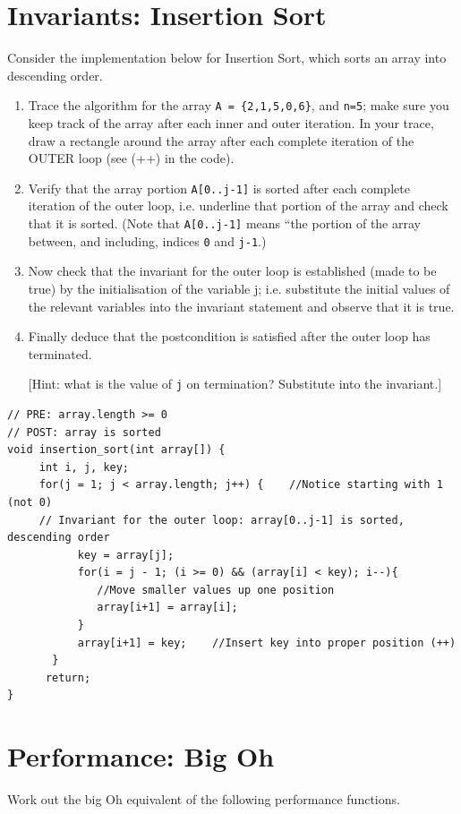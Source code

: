 \documentclass[twoside=false,DIV=14]{scrartcl}
\begin{document}
\section{Invariants: Insertion Sort} Consider the implementation below for Insertion Sort, which sorts an array into descending order.
\begin{enumerate}
\item Trace the algorithm for the array {\tt A = \{2,1,5,0,6\}}, and {\tt n=5}; make sure you keep track of the array after each inner and outer iteration. In your trace, draw a rectangle around the array after each complete iteration of the OUTER loop (see (++) in the code). 

\item Verify that the array portion {\tt A[0..j-1]} is sorted after each complete iteration of the outer loop, i.e. underline that portion of the array and check that it is sorted.  (Note that {\tt A[0..j-1]} means ``the portion of the array between, and including, indices {\tt 0} and {\tt j-1}.) 


\item Now check that the invariant for the outer loop is established (made to be true) by the initialisation of the variable j; i.e. substitute the initial values of the relevant variables into the invariant statement and observe that it is true.

\item Finally deduce that the postcondition is satisfied after the outer loop has terminated. 

[Hint: what is the value of {\tt j} on termination? Substitute into the invariant.]

\end{enumerate}

\begin{verbatim}
// PRE: array.length >= 0
// POST: array is sorted
void insertion_sort(int array[]) {
     int i, j, key;
     for(j = 1; j < array.length; j++) {    //Notice starting with 1 (not 0)
     // Invariant for the outer loop: array[0..j-1] is sorted, descending order
           key = array[j];
           for(i = j - 1; (i >= 0) && (array[i] < key); i--){
              //Move smaller values up one position
              array[i+1] = array[i];
           }
           array[i+1] = key;    //Insert key into proper position (++)
       }
      return;
}
\end{verbatim}  

\section{Performance: Big Oh}
Work out the big Oh equivalent of the following performance functions.
\end{document}
